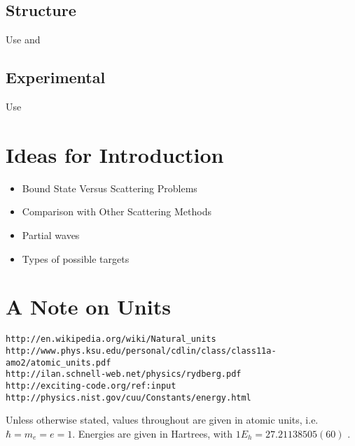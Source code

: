 \documentclass[main.tex]{subfiles}
\begin{document}
\subsection{Structure}
Use \cite{Heyrovska2011} and \cite{Saito2000}




\subsection{Experimental}
Use \cite{Schrader1992}


\section{Ideas for Introduction}

\begin{itemize}
	\item Bound State Versus Scattering Problems
	\item Comparison with Other Scattering Methods
	\item Partial waves
	\item Types of possible targets
\end{itemize}



\section{A Note on Units}
\label{sec:Units}

\begin{verbatim}
http://en.wikipedia.org/wiki/Natural_units
http://www.phys.ksu.edu/personal/cdlin/class/class11a-amo2/atomic_units.pdf
http://ilan.schnell-web.net/physics/rydberg.pdf
http://exciting-code.org/ref:input
http://physics.nist.gov/cuu/Constants/energy.html
\end{verbatim}


Unless otherwise stated, values throughout are given in atomic units, i.e. $\hbar = m_e = e = 1$. Energies are given in Hartrees, with $1 E_h = 27.211 385 05(60)$ \cite{NISTConversions}.
\end{document}
